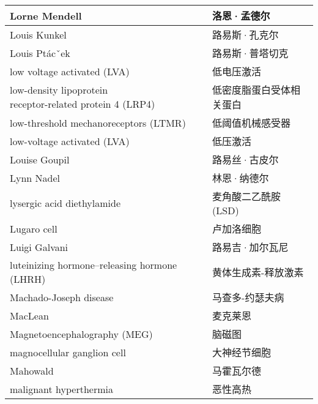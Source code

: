 \begin{longtable}{lll}
	\midrule
	Lorne Mendell  && 洛恩·孟德尔  \\
	
	\midrule
	Louis Kunkel  && 路易斯·孔克尔  \\
	
	\midrule
	Louis Ptácˇek  && 路易斯·普塔切克  \\
	
	\midrule
	low voltage activated (LVA)  && 低电压激活  \\
	
	\midrule
	\makecell[l]{low-density lipoprotein \\receptor-related protein 4 (LRP4)}   && 低密度脂蛋白受体相关蛋白  \\
	
	\midrule
	low-threshold mechanoreceptors (LTMR)   && 低阈值机械感受器  \\
	
	\midrule
	low-voltage activated (LVA)   && 低压激活  \\
	
	\midrule
	Louise Goupil   && 路易丝·古皮尔  \\
	
	\midrule
	Lynn Nadel   && 林恩·纳德尔  \\
	
	\midrule
	lysergic acid diethylamide   && 麦角酸二乙酰胺 (LSD)  \\
	
	\midrule
	Lugaro cell   && 卢加洛细胞  \\
	
	\midrule
	Luigi Galvani   && 路易吉·加尔瓦尼  \\
	
	\midrule
	luteinizing hormone–releasing hormone (LHRH)  && 黄体生成素-释放激素  \\
	
	\midrule
	Machado-Joseph disease   && 马查多-约瑟夫病  \\
	
	\midrule
	MacLean   && 麦克莱恩  \\
		
	\midrule
	Magnetoencephalography (MEG)   && 脑磁图  \\
	
	\midrule
	magnocellular ganglion cell   && 大神经节细胞  \\
	
	\midrule
	Mahowald   && 马霍瓦尔德  \\
	
	\midrule
	malignant hyperthermia   && 恶性高热  \\
	

\end{longtable}
